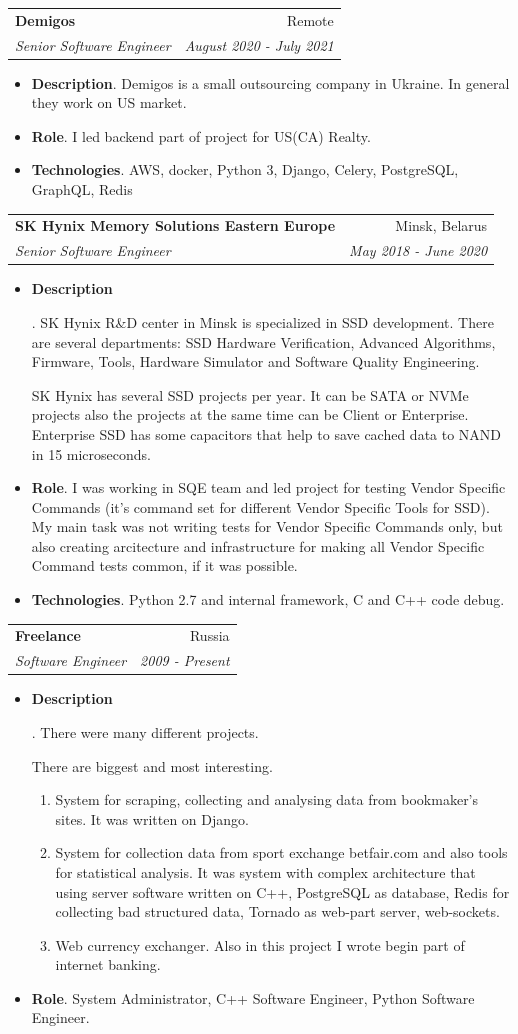 \documentclass[letterpaper,11pt]{article}
\makeatletter
\newcommand{\resumeItem}[2]{
  \item\small{
    \textbf{#1}{. #2 \vspace{-2pt}}
  }
}
\newcommand{\resumeSubheading}[4]{
  \vspace{-1pt}\item
    \begin{tabular*}{0.97\textwidth}{l@{\extracolsep{\fill}}r}
      \textbf{#1} & #2 \\
      \textit{\small#3} & \textit{\small #4} \\
    \end{tabular*}\vspace{-5pt}
}
\newcommand{\resumeItemListStart}{\begin{itemize}}
\newcommand{\resumeItemListEnd}{\end{itemize}\vspace{-5pt}}
\makeatother
\begin{document}
    \resumeSubheading
      {Demigos}{Remote}
      {Senior Software Engineer}{August 2020 - July 2021}
      \resumeItemListStart
        \resumeItem{Description}
	  {Demigos is a small outsourcing company in Ukraine. In general they work on US market.}
	\resumeItem{Role}
	  {I led backend part of project for US(CA) Realty.}
	\resumeItem{Technologies}
	  {AWS, docker, Python 3, Django, Celery, PostgreSQL, GraphQL, Redis}
      \resumeItemListEnd

    \resumeSubheading
      {SK Hynix Memory Solutions Eastern Europe}{Minsk, Belarus}
      {Senior Software Engineer}{May 2018 - June 2020}
      \resumeItemListStart
	\resumeItem{Description}
	 {SK Hynix R\&D center in Minsk is specialized in SSD development. There are several departments: SSD Hardware Verification, Advanced Algorithms, Firmware, Tools, Hardware Simulator and Software Quality Engineering.

	SK Hynix has several SSD projects per year. It can be SATA or NVMe projects also the projects at the same time can be Client or Enterprise. Enterprise SSD has some capacitors that help to save cached data to NAND in 15 microseconds.}
	\resumeItem{Role}
	{I was working in SQE team and led project for testing Vendor Specific Commands (it's command set for different Vendor Specific Tools for SSD). My main task was not writing tests for Vendor Specific Commands only, but also creating arcitecture and infrastructure for making all Vendor Specific Command tests common, if it was possible.}
        \resumeItem{Technologies}
          {Python 2.7 and internal framework, C and C++ code debug.}
      \resumeItemListEnd


    \resumeSubheading
      {Freelance}{Russia}
      {Software Engineer}{2009 - Present}
      \resumeItemListStart
        \resumeItem{Description}
          {There were many different projects.

           There are biggest and most interesting.
	   \begin{enumerate}
             \item System for scraping, collecting and analysing data from bookmaker's sites. It was written on Django.
             \item System for collection data from sport exchange betfair.com and also tools for statistical analysis. It was system with complex architecture that using server software written on C++, PostgreSQL as database, Redis for collecting bad structured data, Tornado as web-part server, web-sockets.
             \item Web currency exchanger. Also in this project I wrote begin part of internet banking.
	   \end{enumerate}}
        \resumeItem{Role}
          {System Administrator, C++ Software Engineer, Python Software Engineer.}
      \resumeItemListEnd
\end{document}
